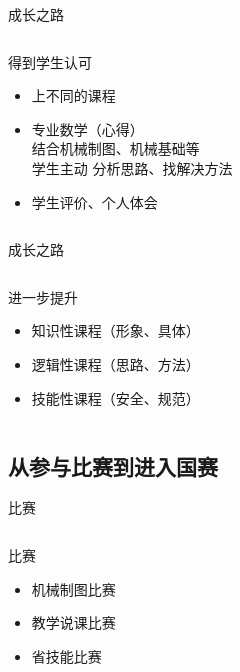 \documentclass[14pt]{beamer}
\begin{document}
\begin{frame}{成长之路}
\begin{columns}
	\begin{block}{\centering 得到学生认可}
		\begin{itemize}[<+->]
			\item 上不同的课程
			\item 专业数学（心得）\\
			      结合机械制图、机械基础等 \\
			      学生主动
			      分析思路、找解决方法
			\item 学生评价、个人体会
		\end{itemize}
	\end{block}
\end{columns}
\end{frame}

\begin{frame}{成长之路}
\begin{columns}
	\begin{block}{\centering 进一步提升}
		\begin{itemize}[<+->]
			\item 知识性课程（形象、具体）
			\item 逻辑性课程（思路、方法）
			\item 技能性课程（安全、规范）
		\end{itemize}
	\end{block}
\end{columns}
\end{frame}


\subsection{从参与比赛到进入国赛}
\begin{frame}{比赛}
\begin{columns}
	\begin{block}{\centering 比赛}
		\begin{itemize}[<+->]
			\item 机械制图比赛
			\item 教学说课比赛
			\item 省技能比赛
		\end{itemize}
	\end{block}
\end{columns}
\end{frame}
\end{document}
